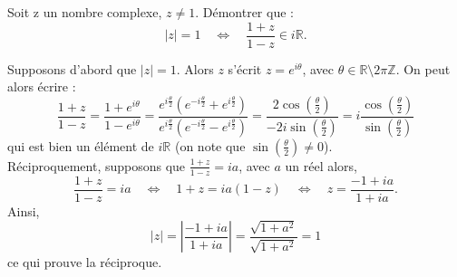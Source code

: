 \documentclass[a4paper, 11pt,openany]{book}%
\newtheorem[L]{thm}{Théorème}[section]
\newtheorem[M]{propo}[thm]{Proposition}
\newtheorem[M]{prop}[thm]{Propriété}
\newtheorem[M]{coro}[thm]{Corollaire}
\newtheorem[M]{lem}[thm]{Lemme}
\newtheorem[M,bodystyle=]{defi}[thm]{Définition}
\newtheorem[M,bodystyle=]{remark}[thm]{Remarque}
\newtheorem[M,bodystyle=]{met}[thm]{Méthode}
\newtheorem[M,bodystyle=]{ret}[thm]{A retenir}
\newtheorem[M,bodystyle=]{idee}[thm]{Idée}
\newtheorem[style=S,underline=false,bodystyle=]{exem}[thm]{Exemple}
\newtheorem[S,underline=false,bodystyle=]{exo}[thm]{Exercice}
\newtheorem[S,underline=false,bodystyle=]{appli}[thm]{Application}
\newtheorem[S,underline=false,bodystyle=]{sol}[thm]{Solution}
\newtheorem[S,underline=false,bodystyle=]{hypo}[thm]{Hypothesis}
\newtheorem[S,underline=false,bodystyle=]{nota}[thm]{Notation}
\begin{document}
\begin{sol}

%
\end{sol}

\begin{exo}

Soit z un nombre complexe, $z \neq 1$. Démontrer que : 
\[ |z|=1 \quad \Leftrightarrow \quad \frac{1+z}{1-z} \in i \mathbb{R}.\]

\end{exo}


\begin{sol}

Supposons d'abord que $|z|=1$. Alors $z$ s'écrit $z=e^{i\theta}$, avec $ \theta \in \mathbb{R} \setminus 2 \pi \mathbb{Z}$. On peut alors écrire :
\[ \frac{1+z}{1-z}=\frac{1+e^{i \theta}}{1  - e^{i\theta}}=\frac{ e^{i \frac{\theta}{2}} \left( e^{-i \frac{\theta}{2}} + e^{i \frac{\theta}{2}} \right)}{e^{i \frac{\theta}{2}} \left( e^{-i \frac{\theta}{2}} - e^{i \frac{\theta}{2}} \right)} =
\frac{2\cos \left( \frac{\theta}{2} \right)}{-2i\sin \left( \frac{\theta}{2} \right)}
=i\frac{\cos \left( \frac{\theta}{2} \right)}{\sin \left( \frac{\theta}{2} \right)}\]
qui est bien un élément de $i\mathbb{R}$ (on note que $\sin \left( \frac{\theta}{2} \right) \neq 0$).\\
Réciproquement, supposons que $\frac{1+z}{1-z}=ia$, avec $a$ un réel alors,
\[ \frac{1+z}{1-z}=ia \quad \Leftrightarrow \quad 1+ z = ia(1-z) \quad \Leftrightarrow \quad z = \frac{-1 + ia}{1+ia}.\]
Ainsi,
\[ | z| = \left| \frac{-1 + ia}{1+ia} \right| = \frac{\sqrt{1+a^2}}{\sqrt{1+a^2}} = 1\]
ce qui prouve la réciproque.

\end{sol}
\end{document}

